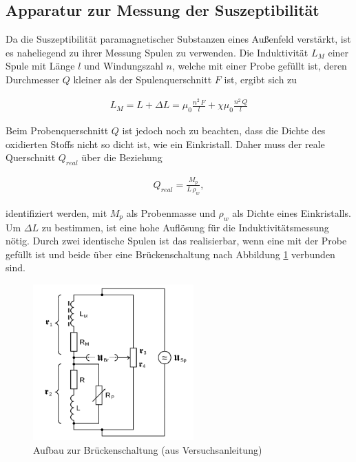 \subsection{Apparatur zur Messung der Suszeptibilität}
Da die Suszeptibilität paramagnetischer Substanzen eines Außenfeld verstärkt, ist es naheliegend zu ihrer Messung Spulen zu verwenden.
Die Induktivität $L_M$ einer Spule mit Länge $l$ und Windungszahl $n$, welche mit einer Probe gefüllt ist, deren Durchmesser $Q$ kleiner 
als der Spulenquerschnitt $F$ ist, ergibt sich zu

\begin{align}
 L_M = L + \Delta L = \mu_0 \frac{n^2 \,F}{l} + \chi \mu_0\frac {n^2 \, Q}{l}
 \label{eqIndu}
\end{align}

Beim Probenquerschnitt $Q$ ist jedoch noch zu beachten, dass die Dichte des oxidierten Stoffs nicht so dicht ist, wie ein Einkristall. 
Daher muss der reale Querschnitt $Q_{real}$ über die Beziehung

\begin{align}
 Q_{real} = \frac{M_p}{L \, \rho_w},
\end{align}

identifiziert werden, mit $M_p$ als Probenmasse und $\rho_w$ als Dichte eines Einkristalls. Um $\Delta L$ zu bestimmen, ist eine hohe
Auflösung für die Induktivitätsmessung nötig. Durch zwei identische Spulen ist das realisierbar, wenn eine mit der Probe gefüllt ist und
beide über eine Brückenschaltung nach Abbildung \ref{picBruecke} verbunden sind.

\begin{figure}[H]
 \includegraphics[width=0.55\textwidth]{pics/bruecke.png}
 \caption{Aufbau zur Brückenschaltung (aus Versuchsanleitung)}
 \label{picBruecke}
\end{figure}

